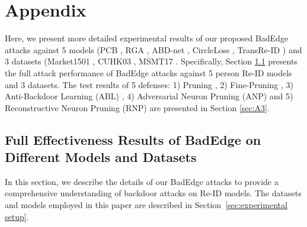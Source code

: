 \documentclass[sigconf,authordraft]{acmart}
\begin{document}




\appendix

\clearpage
\section{Appendix}
Here, we present more detailed experimental results of our proposed BadEdge attacks against 5 models (PCB \cite{sun2018beyond}, RGA \cite{zhang2020relation}, ABD-net \cite{chen2019abd}, CircleLoss \cite{sun2020circle}, TransRe-ID \cite{he2021transreid}) and 3 datasets (Market1501 \cite{zhang2017alignedreid}, CUHK03 \cite{li2014deepreid}, MSMT17 \cite{wei2018person}. Specifically, Section \ref{sec:A1} presents the full attack performance of BadEdge attacks against 5 person Re-ID models and 3 datasets. The test results of 5 defenses: 1) Pruning \cite{dhillon2018stochastic}, 2) Fine-Pruning \cite{liu2018fine}, 3) Anti-Backdoor Learning (ABL) \cite{li2021anti}, 4) Adversarial Neuron Pruning (ANP) \cite{wu2021adversarial} and 5) Reconstructive Neuron Pruning (RNP) are presented in Section \ref{sec:A3}.

\subsection{Full Effectiveness Results of BadEdge on Different Models and Datasets}
\label{sec:A1}
In this section, we describe the details of our BadEdge attacks to provide a comprehensive understanding of backdoor attacks on Re-ID models. The datasets and models employed in this paper are described in Section~\ref{sec:experimental setup}.
\end{document}
